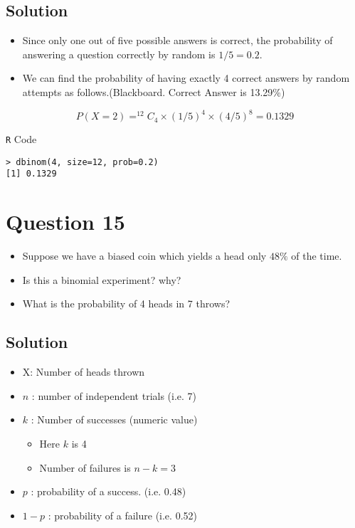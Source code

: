 \documentclass[a4paper,12pt]{article}
\begin{document}
\subsection*{Solution}
\begin{itemize}
\item Since only one out of five possible answers is correct, the probability of answering a question correctly by random is $1/5=0.2$. 
\item We can find the probability of having exactly 4 correct answers by random attempts as follows.(Blackboard. Correct Answer is 13.29\%)
\end{itemize}



\[P(X=2) = ^{12}C_4 \times (1/5)^4 \times (4/5)^8 = 0.1329\]

\begin{framed}
\noindent \texttt{R} Code
\begin{verbatim}
> dbinom(4, size=12, prob=0.2)
[1] 0.1329
\end{verbatim}
\end{framed}

\section*{Question 15}
\begin{itemize}
	
	\item Suppose we have a biased coin which yields a head only $48\%$ of the time.
	\item Is this a binomial experiment?  why?
	\item What is the probability of 4 heads in 7 throws?
\end{itemize}

\subsection*{Solution}
	\begin{itemize}
		\item X: Number of heads thrown
		\item $n$ : number of independent trials (i.e. 7)
		\item $k$ : Number of successes (numeric value)
		\begin{itemize}
			\item Here $k$ is 4
			\item Number of failures is $n-k  =3$
		\end{itemize}
		\item $p$ : probability of a success. (i.e. 0.48)
		\item $1-p$ : probability of a failure (i.e. 0.52)
	\end{itemize}
	
\end{document}
